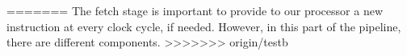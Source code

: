 =======
The fetch stage is important to provide to our processor a new instruction at every clock cycle, if needed.  However, in this part of the pipeline, there are different components.
>>>>>>> origin/testb
